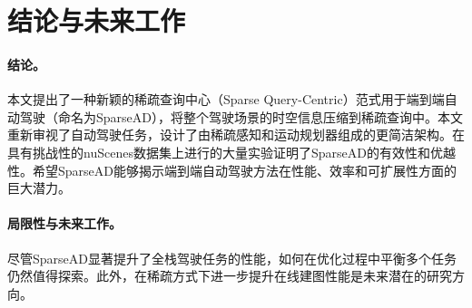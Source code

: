 \section{结论与未来工作}
\paragraph{\textbf{结论。}}
本文提出了一种新颖的稀疏查询中心（Sparse Query-Centric）范式用于端到端自动驾驶（命名为SparseAD），将整个驾驶场景的时空信息压缩到稀疏查询中。本文重新审视了自动驾驶任务，设计了由稀疏感知和运动规划器组成的更简洁架构。在具有挑战性的nuScenes数据集上进行的大量实验证明了SparseAD的有效性和优越性。希望SparseAD能够揭示端到端自动驾驶方法在性能、效率和可扩展性方面的巨大潜力。

\paragraph{\textbf{局限性与未来工作。}}

尽管SparseAD显著提升了全栈驾驶任务的性能，如何在优化过程中平衡多个任务仍然值得探索。此外，在稀疏方式下进一步提升在线建图性能是未来潜在的研究方向。
